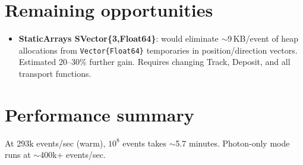 \documentclass{article}
\begin{document}
\section{Remaining opportunities}

\begin{itemize}
  \item \textbf{StaticArrays SVector\{3,Float64\}}: would eliminate
        $\sim$9\,KB/event of heap allocations from
        \texttt{Vector\{Float64\}} temporaries in position/direction
        vectors. Estimated 20--30\% further gain. Requires changing Track,
        Deposit, and all transport functions.
\end{itemize}

\section{Performance summary}

At 293k events/sec (warm), $10^8$ events takes $\sim$5.7 minutes.
Photon-only mode runs at $\sim$400k+ events/sec.
\end{document}
